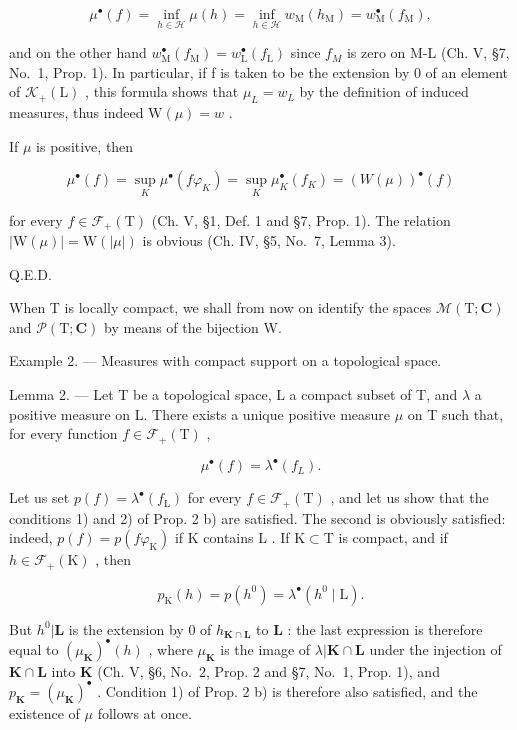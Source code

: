 \[
\mu^ {\bullet} (f) = \inf _ {h \in \mathscr {H}} \mu (h) = \inf _ {h \in \mathscr {H}} w _ {\mathrm{M}} (h _ {\mathrm{M}}) = w _ {\mathrm{M}} ^ {\bullet} (f _ {\mathrm{M}}),
\]

and on the other hand \(w_{\mathrm{M}}^{\bullet}(f_{\mathrm{M}}) = w_{\mathrm{L}}^{\bullet}(f_{\mathrm{L}})\) since \(f_{M}\) is zero on M-L (Ch. V, §7, No.~1, Prop. 1). In particular, if f is taken to be the extension by 0 of an element of \(\mathcal{K}_{+}(\mathrm{L})\) , this formula shows that \(\mu_{L} = w_{L}\) by the definition of induced measures, thus indeed \(\mathrm{W}(\mu) = w\) .

If \(\mu\) is positive, then

\[
\mu^ {\bullet} (f) = \sup _ {K} \mu^ {\bullet} (f \varphi_ {K}) = \sup _ {K} \mu_ {K} ^ {\bullet} (f _ {K}) = (W (\mu)) ^ {\bullet} (f)
\]

for every \(f \in \mathcal{F}_{+}(\mathrm{T})\) (Ch. V, §1, Def. 1 and §7, Prop. 1). The relation \(|\mathrm{W}(\mu)| = \mathrm{W}(|\mu|)\) is obvious (Ch. IV, §5, No.~7, Lemma 3).

Q.E.D.

When T is locally compact, we shall from now on identify the spaces \(\mathcal{M}(\mathrm{T};\mathbf{C})\) and \(\mathcal{P}(\mathrm{T};\mathbf{C})\) by means of the bijection W.

Example 2. --- Measures with compact support on a topological space.

Lemma 2. --- Let T be a topological space, L a compact subset of T, and \(\lambda\) a positive measure on L. There exists a unique positive measure \(\mu\) on T such that, for every function \(f \in \mathcal{F}_{+}(\mathrm{T})\) ,

\[
\mu^ {\bullet} (f) = \lambda^ {\bullet} (f _ {L}).\tag{2}
\]

Let us set \(p(f) = \lambda^{\bullet}(f_{\mathrm{L}})\) for every \(f \in \mathcal{F}_{+}(\mathrm{T})\) , and let us show that the conditions 1) and 2) of Prop. 2 b) are satisfied. The second is obviously satisfied: indeed, \(p(f) = p(f\varphi_{\mathrm{K}})\) if \(\mathrm{K}\) contains \(\mathrm{L}\) . If \(\mathrm{K} \subset \mathrm{T}\) is compact, and if \(h \in \mathcal{F}_{+}(\mathrm{K})\) , then

\[
p _ {\mathrm{K}} (h) = p \left(h ^ {0}\right) = \lambda^ {\bullet} \left(h ^ {0} \mid \mathrm{L}\right).
\]

But \(h^0 | \mathbf{L}\) is the extension by 0 of \(h_{\mathbf{K} \cap \mathbf{L}}\) to \(\mathbf{L}\) : the last expression is therefore equal to \((\mu_{\mathbf{K}})^{\bullet}(h)\) , where \(\mu_{\mathbf{K}}\) is the image of \(\lambda | \mathbf{K} \cap \mathbf{L}\) under the injection of \(\mathbf{K} \cap \mathbf{L}\) into \(\mathbf{K}\) (Ch. V, §6, No.~2, Prop. 2 and §7, No.~1, Prop. 1), and \(p_{\mathbf{K}} = (\mu_{\mathbf{K}})^{\bullet}\) . Condition 1) of Prop. 2 b) is therefore also satisfied, and the existence of \(\mu\) follows at once.

